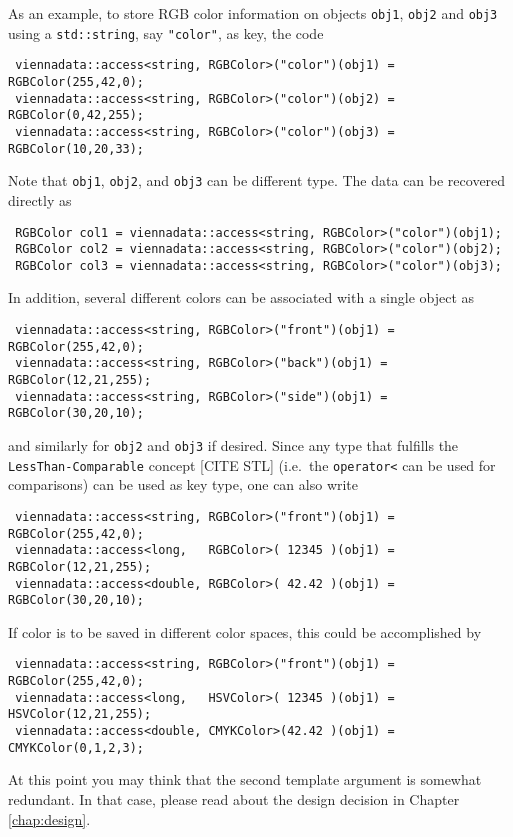 As an example, to store RGB color information on objects \lstinline|obj1|, \lstinline|obj2| and \lstinline|obj3| using a \lstinline|std::string|, say \lstinline|"color"|, as key,
the code
\begin{lstlisting}
 viennadata::access<string, RGBColor>("color")(obj1) = RGBColor(255,42,0);
 viennadata::access<string, RGBColor>("color")(obj2) = RGBColor(0,42,255);
 viennadata::access<string, RGBColor>("color")(obj3) = RGBColor(10,20,33);
\end{lstlisting}
Note that \lstinline|obj1|, \lstinline|obj2|, and \lstinline|obj3| can be different type.
The data can be recovered directly as
\begin{lstlisting}
 RGBColor col1 = viennadata::access<string, RGBColor>("color")(obj1);
 RGBColor col2 = viennadata::access<string, RGBColor>("color")(obj2);
 RGBColor col3 = viennadata::access<string, RGBColor>("color")(obj3);
\end{lstlisting}
 In addition, several different colors can be associated with a single object
as
\begin{lstlisting}
 viennadata::access<string, RGBColor>("front")(obj1) = RGBColor(255,42,0);
 viennadata::access<string, RGBColor>("back")(obj1) = RGBColor(12,21,255);
 viennadata::access<string, RGBColor>("side")(obj1) = RGBColor(30,20,10);
\end{lstlisting}
and similarly for \lstinline|obj2| and \lstinline|obj3| if desired. Since any type that fulfills the \lstinline|LessThan-Comparable| concept [CITE STL] (i.e.~the \lstinline|operator<| can be used for comparisons) can be used as key type, one can also write
\begin{lstlisting}
 viennadata::access<string, RGBColor>("front")(obj1) = RGBColor(255,42,0);
 viennadata::access<long,   RGBColor>( 12345 )(obj1) = RGBColor(12,21,255);
 viennadata::access<double, RGBColor>( 42.42 )(obj1) = RGBColor(30,20,10);
\end{lstlisting}
If color is to be saved in different color spaces, this could be accomplished by 
\begin{lstlisting}
 viennadata::access<string, RGBColor>("front")(obj1) = RGBColor(255,42,0);
 viennadata::access<long,   HSVColor>( 12345 )(obj1) = HSVColor(12,21,255);
 viennadata::access<double, CMYKColor>(42.42 )(obj1) = CMYKColor(0,1,2,3);
\end{lstlisting}
At this point you may think that the second template argument is somewhat redundant. In that case, please read about the design decision in Chapter \ref{chap:design}.


